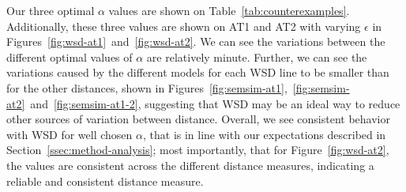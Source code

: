 Our three optimal $\alpha$ values are shown on Table~\ref{tab:counterexamples}. Additionally, these three values are shown on AT1 and AT2 with varying $\epsilon$ in Figures~\ref{fig:wsd-at1}~and~\ref{fig:wsd-at2}. We can see the variations between the different optimal values of $\alpha$ are relatively minute. Further, we can see the variations caused by the different models for each WSD line to be smaller than for the other distances, shown in Figures~\ref{fig:semsim-at1},~\ref{fig:semsim-at2}~and~\ref{fig:semsim-at1-2}, suggesting that WSD may be an ideal way to reduce other sources of variation between distance. Overall, we see consistent behavior with WSD for well chosen $\alpha$, that is in line with our expectations described in Section~\ref{ssec:method-analysis}; most importantly, that for Figure~\ref{fig:wsd-at2}, the values are consistent across the different distance measures, indicating a reliable and consistent distance measure.




